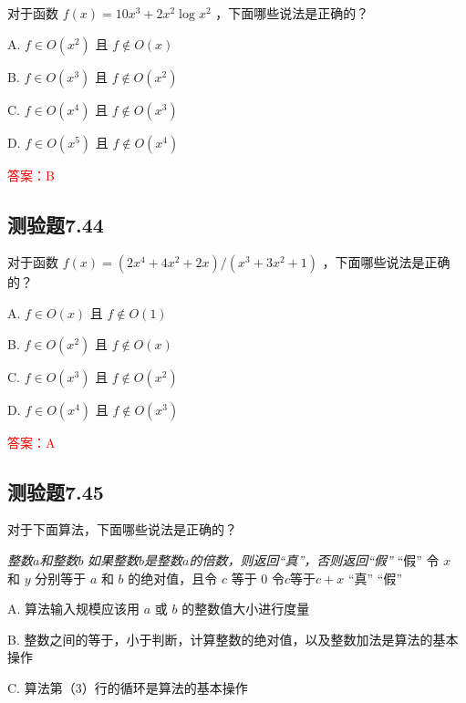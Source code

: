 \documentclass[UTF8, heading=true]{ctexart}
\begin{document}
对于函数 $f(x)=10 x^3+2 x^2 \log x^2$ ，下面哪些说法是正确的？

A. $f \in O\left(x^2\right)$ 且 $f \notin O(x)$

B. $f \in O\left(x^3\right)$ 且 $f \notin O\left(x^2\right)$

C. $f \in O\left(x^4\right)$ 且 $f \notin O\left(x^3\right)$

D. $f \in O\left(x^5\right)$ 且 $f \notin O\left(x^4\right)$

\textcolor{red}{答案：B}

\subsection{测验题7.44}

对于函数 $f(x)=\left(2 x^4+4 x^2+2 x\right) /\left(x^3+3 x^2+1\right)$ ，下面哪些说法是正确的？

A. $f \in O(x)$ 且 $f \notin O(1)$

B. $f \in O\left(x^2\right)$ 且 $f \notin O(x)$

C. $f \in O\left(x^3\right)$ 且 $f \notin O\left(x^2\right)$

D. $ f \in O\left(x^4\right)$ 且 $f \notin O\left(x^3\right)$

\textcolor{red}{答案：A}


\subsection{测验题7.45}

对于下面算法，下面哪些说法是正确的？

\begin{algorithm}
  \caption{\textbf{判断两个数是否是倍数关系}}
  \begin{algorithmic}[1]
      \Require \textit{整数$a$和整数$b$}
      \Ensure \textit{如果整数$b$是整数$a$的倍数，则返回“真”，否则返回“假”}
       \Return “假” 
      \EndIf
      \State 令 $x$ 和 $y$ 分别等于 $a$ 和 $b$ 的绝对值，且令 $c$ 等于 0\;
       令$c$等于$c+x$
      \EndWhile
       \Return “真”
      \Else 
      \State \Return “假”\;
      \EndIf
  \end{algorithmic}
\end{algorithm}

A. 算法输入规模应该用 $a$ 或 $b$ 的整数值大小进行度量

B. 整数之间的等于，小于判断，计算整数的绝对值，以及整数加法是算法的基本操作

C. 算法第（3）行的循环是算法的基本操作
\end{document}

